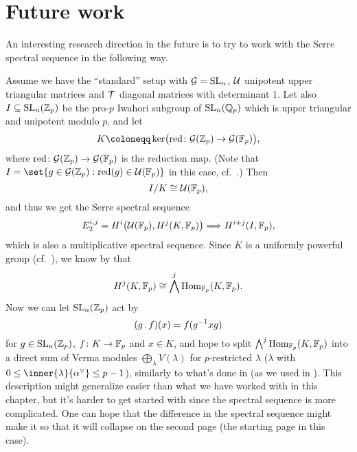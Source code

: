 \section{Future work}%
\label{sec:future}

An interesting research direction in the future is to try to work with the Serre spectral sequence in the following way.

Assume we have the \enquote{standard} setup with $\mathcal{G} = \operatorname{SL}_{n}$, $\mathcal{U}$ unipotent upper triangular matrices and $\mathcal{T}$ diagonal matrices with determinant $1$. Let also $I \subseteq \operatorname{SL}_{n}(\mathbb{Z}_{p})$ be the pro-$p$ Iwahori subgroup of $\operatorname{SL}_{n}(\mathbb{Q}_{p})$ which is upper triangular and unipotent modulo $p$, and let
\begin{equation*}
  K \coloneqq \kernel\bigl( \red \colon \gs{G}(\Z_{p}) \to \gs{G}(\F_{p}) \bigr),
\end{equation*}
where $\operatorname{red} \colon \mathcal{G}(\mathbb{Z}_{p}) \to \mathcal{G}(\mathbb{F}_{p})$ is the reduction map. (Note that $I = \set{g \in \gs{G}(\Z_{p}) : \red(g) \in \gs{U}(\F_{p})}$ in this case, cf.\ \cite{Generators}.) Then
\begin{equation*}
  I/K \cong \mathcal{U}(\mathbb{F}_{p}),
\end{equation*}
and thus we get the Serre spectral sequence
\begin{equation*}
  E_{2}^{i,j} = H^{i}\bigl( \mathcal{U}(\mathbb{F}_{p}), H^{j}(K,\mathbb{F}_{p}) \bigr) \Longrightarrow H^{i+j}(I,\mathbb{F}_{p}),
\end{equation*}
which is also a multiplicative spectral sequence. Since $K$ is a uniformly powerful group (cf.\ \cite[Prop.~7.6]{SchOll-modular}), we know by \cite[p.~183]{Laz} that
\begin{equation*}
  H^{j}(K,\mathbb{F}_{p}) \cong \bigwedge^{j} \operatorname{Hom}_{\mathbb{F}_{p}}(K,\mathbb{F}_{p}).
\end{equation*}
Now we can let $\operatorname{SL}_{n}(\mathbb{Z}_{p})$ act by
\begin{equation*}
  (g \,.\, f)(x) = f(g^{-1}xg)
\end{equation*}
for $g \in \operatorname{SL}_{n}(\mathbb{Z}_{p})$, $f \colon K \to \mathbb{F}_{p}$ and $x \in K$, and hope to split $\bigwedge^{j} \operatorname{Hom}_{\mathbb{F}_{p}}(K,\mathbb{F}_{p})$ into a direct sum of Verma modules $\bigoplus_{\lambda} V(\lambda)$ for $p$-restricted $\lambda$ ($\lambda$ with $0 \leq \inner{\lambda}{\alpha^{\vee}} \leq p-1$), similarly to what's done in \cite{PT} (as we used in ). This description might generalize easier than what we have worked with in this chapter, but it's harder to get started with since the spectral sequence is more complicated. One can hope that the difference in the spectral sequence might make it so that it will collapse on the second page (the starting page in this case).



